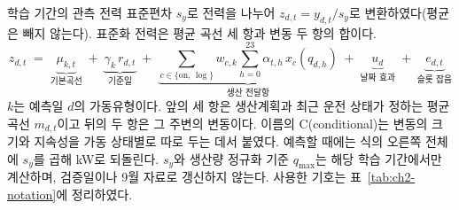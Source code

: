 학습 기간의 관측 전력 표준편차 $s_y$로 전력을 나누어 $z_{d,t}=y_{d,t}/s_y$로 변환하였다(평균은 빼지 않는다). 표준화 전력은 평균 곡선 세 항과 변동 두 항의 합이다.
\begin{equation}
z_{d,t} \;=\; \underbrace{\mu_{k,t}}_{\text{기본곡선}}
\;+\; \underbrace{\gamma_k\, r_{d,t}}_{\text{기준일}}
\;+\; \underbrace{\sum_{c\in\{\mathrm{on},\,\log\}} w_{c,k} \sum_{h=0}^{23} \alpha_{t,h}\, x_c(q_{d,h})}_{\text{생산 전달항}}
\;+\; \underbrace{u_d}_{\text{날짜 효과}}
\;+\; \underbrace{e_{d,t}}_{\text{슬롯 잡음}}
\label{eq:ch2-cbat}
\end{equation}
$k$는 예측일 $d$의 가동유형이다. 앞의 세 항은 생산계획과 최근 운전 상태가 정하는 평균 곡선 $m_{d,t}$이고 뒤의 두 항은 그 주변의 변동이다. 이름의 C(conditional)는 변동의 크기와 지속성을 가동 상태별로 따로 두는 데서 붙였다. 예측할 때에는 식의 오른쪽 전체에 $s_y$를 곱해 kW로 되돌린다. $s_y$와 생산량 정규화 기준 $q_{\max}$는 해당 학습 기간에서만 계산하며, 검증일이나 9월 자료로 갱신하지 않는다. 사용한 기호는 표~\ref{tab:ch2-notation}에 정리하였다.

